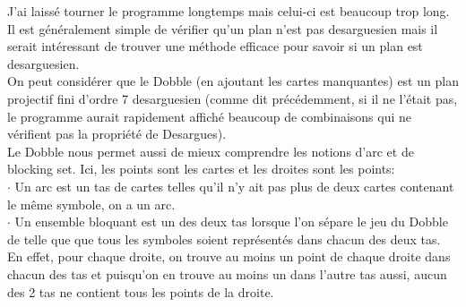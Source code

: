 \documentclass[a4paper]{article}
\begin{document}
J'ai laissé tourner le programme longtemps mais celui-ci est beaucoup trop long. Il est généralement simple de vérifier qu'un plan n'est pas desarguesien mais il serait intéressant de trouver une méthode efficace pour savoir si un plan est desarguesien.\\ 
On peut considérer que le Dobble (en ajoutant les cartes manquantes) est un plan projectif fini d'ordre 7 desarguesien (comme dit précédemment, si il ne l'était pas, le programme aurait rapidement affiché beaucoup de combinaisons qui ne vérifient pas la propriété de Desargues).
\bigskip\\
Le Dobble nous permet aussi de mieux comprendre les notions d'arc et de blocking set. Ici, les points sont les cartes et les droites sont les points:\\
$\cdot$ Un arc est un tas de cartes telles qu'il n'y ait pas plus de deux cartes contenant le même symbole, on a un arc. \\
$\cdot$ Un ensemble bloquant est un des deux tas lorsque l'on sépare le jeu du Dobble de telle que que tous les symboles soient représentés dans chacun des deux tas. En effet, pour chaque droite, on trouve au moins un point de chaque droite dans chacun des tas et puisqu'on en trouve au moins un dans l'autre tas aussi, aucun des 2 tas ne contient tous les points de la droite.
\newpage
\end{document}
